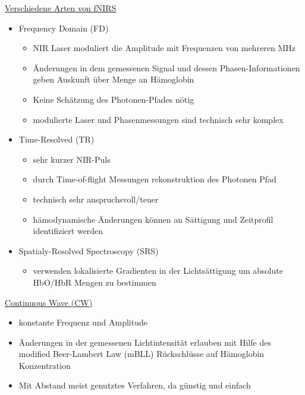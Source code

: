 \documentclass[a4paper,10pt,oneside]{article}
\begin{document}
\underline{Verschiedene Arten von fNIRS} \\	
	\begin{itemize}
		\item Frequency Domain (FD)
			\begin{itemize}
				\item NIR Laser moduliert die Amplitude mit Frequenzen von mehreren MHz
				\item Änderungen in dem gemessenen Signal und dessen Phasen-Informationen geben Auskunft über Menge an Hämoglobin
				\item Keine Schätzung des Photonen-Pfades nötig
				\item modulierte Laser und Phasenmessungen sind technisch sehr komplex
			\end{itemize}
		\item Time-Resolved (TR)
			\begin{itemize}
				\item sehr kurzer NIR-Puls
				\item durch Time-of-flight Messungen rekonstruktion des Photonen Pfad
				\item technisch sehr anspruchsvoll/teuer
				\item hämodynamische Änderungen können an Sättigung und Zeitprofil identifiziert werden
			\end{itemize}
		\item Spatialy-Resolved Spectroscopy (SRS)
			\begin{itemize}
				\item verwenden lokalisierte Gradienten in der Lichtsättigung um absolute HbO/HbR Mengen zu bestimmen
			\end{itemize}
	\end{itemize}
 		
\underline{Continuous Wave (CW)} \\
 	\begin{itemize}
 		\item konstante Frequenz und Amplitude
 		\item Änderungen in der gemessenen Lichtintensität erlauben mit Hilfe des modified Beer-Lambert Law (mBLL) Rückschlüsse auf Hämoglobin Konzentration
 		\item Mit Abstand meist genutztes Verfahren, da günstig und einfach
 	\end{itemize}
 	
\end{document}
